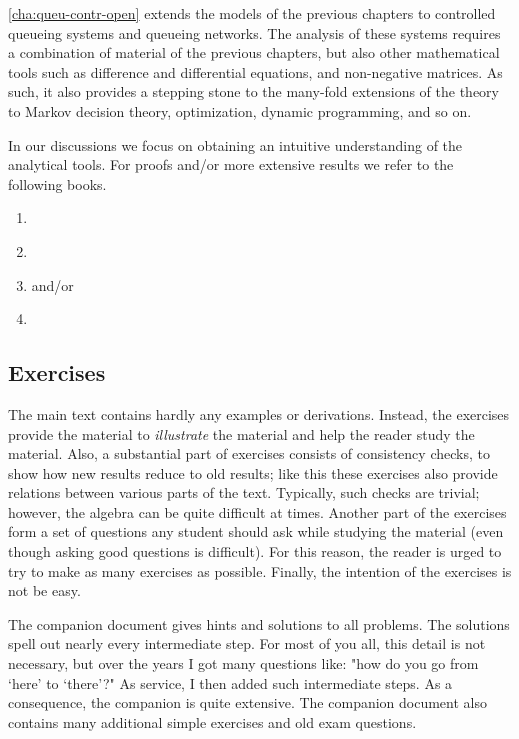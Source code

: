 \cref{cha:queu-contr-open} extends the models of the previous chapters to controlled queueing systems and queueing networks.
The analysis of these systems requires a combination of material of the previous chapters, but also other mathematical tools such as difference and differential equations, and non-negative matrices.
As such, it also provides a stepping stone to the many-fold extensions of the theory to Markov decision theory, optimization, dynamic programming, and so on.

In our discussions we focus on obtaining an intuitive understanding of the analytical tools. For proofs and/or more extensive results we refer to the following books.
\begin{enumerate}
\item \citet{bolch06:_queuein_networ_markov_chain}
\item \citet{el-taha98:_sampl_path_analy_queuein_system}
\item \citet{tijms94:_stoch_model_algor_approac} and/or \citet{tijms03:_first_cours_stoch_model}
\item \citet{capinski03:_probab_probl}
\end{enumerate}



\subsection*{Exercises}

The main text contains hardly any examples or derivations.
Instead, the exercises provide the material to \emph{illustrate} the material and help the reader study the material.
Also, a substantial part of exercises consists of consistency checks, to show how new results reduce to old results; like this these exercises also provide relations between various parts of the text.
Typically, such checks are trivial; however, the algebra can be quite difficult at times.
Another part of the exercises form a set of questions any student should ask while studying the material (even though asking good questions is difficult).
For this reason, the reader is urged to try to make as many exercises as possible.
Finally, the intention of  the exercises is not be easy.

The companion document gives hints and solutions to all problems.
The solutions spell out nearly every intermediate step.
For most of you all, this detail is not necessary, but over the years I got many questions like: "how do you go from `here' to `there'?"
As service, I then added such intermediate steps.
As a consequence, the companion is quite extensive.
The companion document also contains many additional simple exercises and old exam questions.

